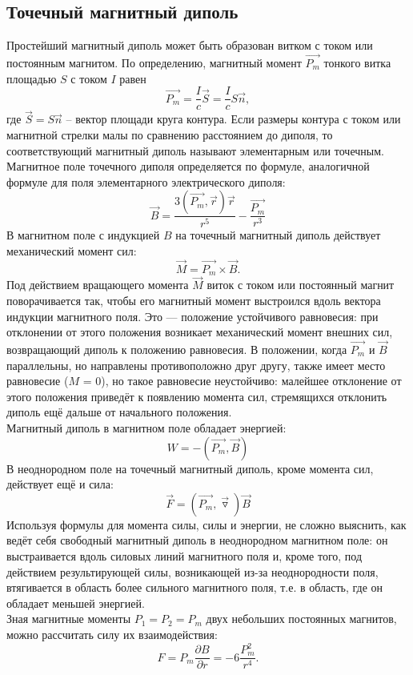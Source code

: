 \documentclass[a4paper,12pt]{article}
\begin{document}
\subsection*{Точечный магнитный диполь}
Простейший магнитный диполь может быть образован витком с током или постоянным магнитом. По определению, магнитный момент $\overrightarrow{P_m}$ тонкого витка площадью $S$ с током $I$ равен
$$
\overrightarrow{P_m}=\dfrac{I}{c}\vec{S}=\dfrac{I}{c}S\vec{n},
$$
где $\vec{S}=S\vec{n}$ -- вектор площади круга контура. Если размеры контура с током или магнитной стрелки малы по сравнению расстоянием до диполя, то соответствующий магнитный диполь называют элементарным или точечным.\\
Магнитное поле точечного диполя определяется по формуле, аналогичной формуле для поля
элементарного электрического диполя:
$$
\vec{B}=\dfrac{3(\overrightarrow{P_m},\vec{r})\vec{r}}{r^5} - \dfrac{\overrightarrow{P_m}}{r^3}
$$ 
В магнитном поле с индукцией $B$
на точечный магнитный диполь 
действует механический
момент сил:
$$
\vec{M} = \overrightarrow{P_m}\times \vec{B}.
$$
Под действием вращающего момента $\vec{M}$ виток с током или постоянный магнит поворачивается
так, чтобы его магнитный момент выстроился вдоль вектора индукции магнитного поля. Это —
положение устойчивого равновесия: при отклонении от этого положения возникает механический
момент внешних сил, возвращающий диполь к положению равновесия. В положении, когда $\overrightarrow{P_m}$ и $\vec{B}$
параллельны, но направлены противоположно друг другу, также имеет место равновесие ($M$ = 0),
но такое равновесие неустойчиво: малейшее отклонение от этого положения приведёт к появлению
момента сил, стремящихся отклонить диполь ещё дальше от начального положения.\\
Магнитный диполь в магнитном поле обладает энергией:
$$
W = -(\overrightarrow{P_m},\vec{B})
$$
В неоднородном поле на точечный магнитный диполь, кроме момента сил, действует ещё и сила:
$$
\vec{F}=(\overrightarrow{P_m},\vec{\triangledown})\vec{B}
$$
Используя формулы для момента силы, силы и энергии, не сложно выяснить, как ведёт себя
свободный магнитный диполь в неоднородном магнитном поле: он выстраивается вдоль силовых
линий магнитного поля и, кроме того, под действием результирующей силы, возникающей из-за
неоднородности поля, втягивается в область более сильного магнитного поля, т.е. в область, где он
обладает меньшей энергией.\\
Зная магнитные моменты $P_1 = P_2 = P_m$ двух небольших постоянных магнитов, можно рассчитать силу
их взаимодействия:
$$
F = P_m \dfrac{\partial B}{\partial r}=-6\dfrac{P_m^2}{r^4}.
$$
\end{document}
